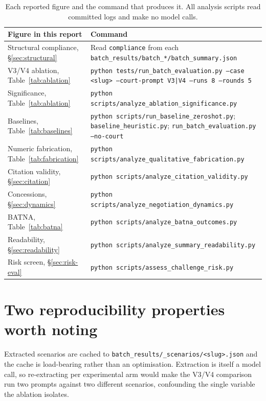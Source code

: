\begin{table}[htbp]
\centering
\footnotesize
\caption[Reproduction commands]{Each reported figure and the command that
produces it. All analysis scripts read committed logs and make no model calls.}
\begin{tabular}{|p{5.0cm}|p{7.4cm}|}
\hline
\textbf{Figure in this report} & \textbf{Command} \\
\hline
Structural compliance, \S\ref{sec:structural} &
  Read \texttt{compliance} from each \texttt{batch\_results/batch\_*/batch\_summary.json} \\
\hline
V3/V4 ablation, Table~\ref{tab:ablation} &
  \texttt{python tests/run\_batch\_evaluation.py --case <slug> --court-prompt V3|V4 --runs 8 --rounds 5} \\
\hline
Significance, Table~\ref{tab:ablation} &
  \texttt{python scripts/analyze\_ablation\_significance.py} \\
\hline
Baselines, Table~\ref{tab:baselines} &
  \texttt{python scripts/run\_baseline\_zeroshot.py}; \texttt{baseline\_heuristic.py}; \texttt{run\_batch\_evaluation.py --no-court} \\
\hline
Numeric fabrication, Table~\ref{tab:fabrication} &
  \texttt{python scripts/analyze\_qualitative\_fabrication.py} \\
\hline
Citation validity, \S\ref{sec:citation} &
  \texttt{python scripts/analyze\_citation\_validity.py} \\
\hline
Concessions, \S\ref{sec:dynamics} &
  \texttt{python scripts/analyze\_negotiation\_dynamics.py} \\
\hline
BATNA, Table~\ref{tab:batna} &
  \texttt{python scripts/analyze\_batna\_outcomes.py} \\
\hline
Readability, \S\ref{sec:readability} &
  \texttt{python scripts/analyze\_summary\_readability.py} \\
\hline
Risk screen, \S\ref{sec:risk-eval} &
  \texttt{python scripts/assess\_challenge\_risk.py} \\
\hline
\end{tabular}
\end{table}

\section{Two reproducibility properties worth noting}

Extracted scenarios are cached to \texttt{batch\_results/\_scenarios/<slug>.json}
and the cache is load-bearing rather than an optimisation. Extraction is itself a
model call, so re-extracting per experimental arm would make the V3/V4 comparison
run two prompts against two different scenarios, confounding the single variable
the ablation isolates.


